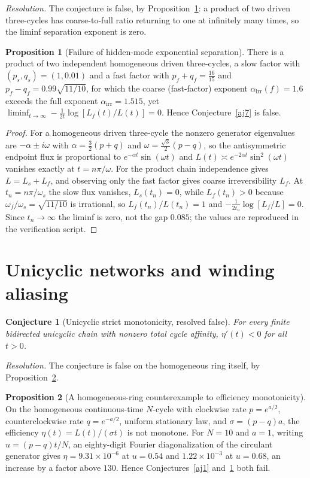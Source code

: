 \documentclass[11pt]{article}
\newtheorem{conjecture}{Conjecture}
\theoremstyle{definition}
\newtheorem{proposition}{Proposition}
\begin{document}
\emph{Resolution.} The conjecture is false, by Proposition~\ref{aj:c7}: a product of two driven three-cycles has coarse-to-full ratio returning to one at infinitely many times, so the liminf separation exponent is zero.

\begin{proposition}[Failure of hidden-mode exponential separation]\label{aj:c7}
There is a product of two independent homogeneous driven three-cycles, a slow factor with $(p_s,q_s)=(1,0.01)$ and a fast factor with $p_f+q_f=\tfrac{16}{15}$ and $p_f-q_f=0.99\sqrt{11/10}$, for which the coarse (fast-factor) exponent $\alpha_{\mathrm{irr}}(f)=1.6$ exceeds the full exponent $\alpha_{\mathrm{irr}}=1.515$, yet $\liminf_{t\to\infty}-\tfrac1{2t}\log[L_f(t)/L(t)]=0$.  Hence Conjecture~\ref{aj7} is false.
\end{proposition}

\begin{proof}
For a homogeneous driven three-cycle the nonzero generator eigenvalues are $-\alpha\pm i\omega$ with $\alpha=\tfrac32(p+q)$ and $\omega=\tfrac{\sqrt3}2(p-q)$, so the antisymmetric endpoint flux is proportional to $e^{-\alpha t}\sin(\omega t)$ and $L(t)\asymp e^{-2\alpha t}\sin^2(\omega t)$ vanishes exactly at $t=n\pi/\omega$.  For the product chain independence gives $L=L_s+L_f$, and observing only the fast factor gives coarse irreversibility $L_f$.  At $t_n=n\pi/\omega_s$ the slow flux vanishes, $L_s(t_n)=0$, while $L_f(t_n)>0$ because $\omega_f/\omega_s=\sqrt{11/10}$ is irrational, so $L_f(t_n)/L(t_n)=1$ and $-\tfrac1{2t_n}\log[L_f/L]=0$.  Since $t_n\to\infty$ the liminf is zero, not the gap $0.085$; the values are reproduced in the verification script.
\end{proof}

\section{Unicyclic networks and winding aliasing}

\begin{conjecture}[Unicyclic strict monotonicity, resolved false]\label{aj8}
For every finite bidirected unicyclic chain with nonzero total cycle affinity, $\eta'(t)<0$ for all $t>0$.
\end{conjecture}

\emph{Resolution.} The conjecture is false on the homogeneous ring itself, by Proposition~\ref{aj:c1}.

\begin{proposition}[A homogeneous-ring counterexample to efficiency monotonicity]\label{aj:c1}
On the homogeneous continuous-time $N$-cycle with clockwise rate $p=e^{a/2}$, counterclockwise rate $q=e^{-a/2}$, uniform stationary law, and $\sigma=(p-q)a$, the efficiency $\eta(t)=L(t)/(\sigma t)$ is not monotone.  For $N=10$ and $a=1$, writing $u=(p-q)t/N$, an eighty-digit Fourier diagonalization of the circulant generator gives $\eta=9.31\times10^{-6}$ at $u=0.54$ and $1.22\times10^{-3}$ at $u=0.68$, an increase by a factor above $130$.  Hence Conjectures~\ref{aj1} and~\ref{aj8} both fail.
\end{proposition}
\end{document}
